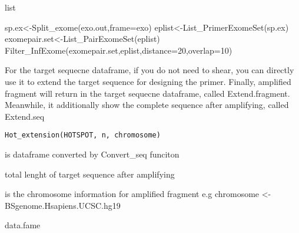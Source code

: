 \documentclass[a4paper]{book}
\begin{document}
%
\begin{Value}
list
\end{Value}
%
\begin{Examples}
\begin{ExampleCode}
sp.ex<-Split_exome(exo.out,frame=exo)
eplist<-List_PrimerExomeSet(sp.ex)
exomepair.set<-List_PairExomeSet(eplist)
Filter_InfExome(exomepair.set,eplist,distance=20,overlap=10)
\end{ExampleCode}
\end{Examples}
%
\begin{Description}\relax
For the target sequecne dataframe, if you do not need to shear, you can directly use it to
extend the target sequence for designing the primer. Finally, amplified fragment will return
in the target sequecne dataframe, called Extend.fragment. Meanwhile, it additionally show the complete
sequence after amplifying, called Extend.seq
\end{Description}
%
\begin{Usage}
\begin{verbatim}
Hot_extension(HOTSPOT, n, chromosome)
\end{verbatim}
\end{Usage}
%
\begin{Arguments}
\begin{ldescription}
\item[\code{HOTSPOT}] is dataframe converted by Convert\_seq funciton

\item[\code{n}] total lenght of target sequence after amplifying

\item[\code{chromosome}] is the chromosome information for amplified fragment
e.g chromosome <- BSgenome.Hsapiens.UCSC.hg19
\end{ldescription}
\end{Arguments}
%
\begin{Value}
data.fame
\end{Value}
%
\begin{Examples}
\end{Examples}
\end{document}
